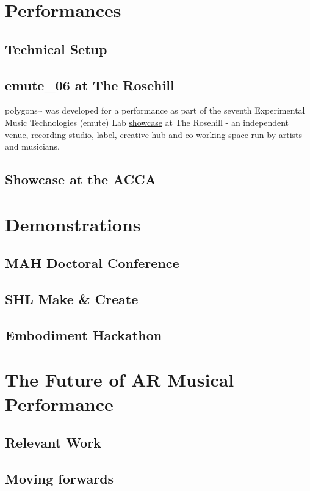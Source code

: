 \section{Performances} \label{sec: polygons-performances}
\subsection{Technical Setup} \label{sec: polygons-performances-setup}


\subsection{emute\_06 at The Rosehill} \label{sec: polygons-performances-rosehill}
polygons\textasciitilde{} was developed for a performance as part of the seventh Experimental Music Technologies (emute) Lab \href{http://www.emutelab.org/blog/emutelab6}{showcase} at The Rosehill - an independent venue, recording studio, label, creative hub and co-working space run by artists and musicians.
\subsection{Showcase at the ACCA} \label{sec: polygons-performances-acca}



\section{Demonstrations} \label{sec: polygons-demonstrations}
\subsection{MAH Doctoral Conference} \label{sec: polygons-demonstrations-mah}
\subsection{SHL Make \& Create} \label{sec: polygons-demonstrations-shl}
\subsection{Embodiment Hackathon} \label{sec: polygons-demonstrations-emh}



\section{The Future of AR Musical Performance}
\subsection{Relevant Work}
\subsection{Moving forwards}